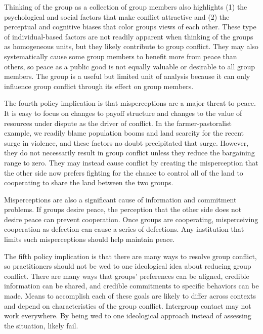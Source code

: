 \documentclass[11pt]{article}
\begin{document}
Thinking of the group as a collection of group members also highlights
(1) the psychological and social factors that make conflict attractive
and (2) the perceptual and cognitive biases that color groups views of
each other. These type of individual-based factors are not readily
apparent when thinking of the groups as homogeneous units, but they
likely contribute to group conflict. They may also systematically cause
some group members to benefit more from peace than others, so peace as a
public good is not equally valuable or desirable to all group members.
The group is a useful but limited unit of analysis because it can only
influence group conflict through its effect on group members.

The fourth policy implication is that misperceptions are a major threat
to peace. It is easy to focus on changes to payoff structure and changes
to the value of resources under dispute as the driver of conflict. In
the farmer-pastoralist example, we readily blame population booms and
land scarcity for the recent surge in violence, and these factors no
doubt precipitated that surge. However, they do not necessarily result
in group conflict unless they reduce the bargaining range to zero. They
may instead cause conflict by creating the misperception that the other
side now prefers fighting for the chance to control all of the land to
cooperating to share the land between the two groups.

Misperceptions are also a significant cause of information and
commitment problems. If groups desire peace, the perception that the
other side does not desire peace can prevent cooperation. Once groups
are cooperating, misperceiving cooperation as defection can cause a
series of defections. Any institution that limits such misperceptions
should help maintain peace.

The fifth policy implication is that there are many ways to resolve
group conflict, so practitioners should not be wed to one ideological
idea about reducing group conflict. There are many ways that groups'
preferences can be aligned, credible information can be shared, and
credible commitments to specific behaviors can be made. Means to
accomplish each of these goals are likely to differ across contexts and
depend on characteristics of the group conflict. Intergroup contact may
not work everywhere. By being wed to one ideological approach instead of
assessing the situation, likely fail.
\end{document}
